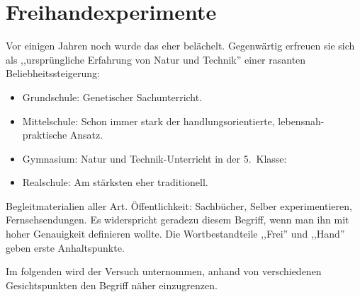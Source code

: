 \bip\bip
\section{Freihandexperimente}

Vor einigen Jahren noch wurde das eher bel\"{a}chelt. Gegenw\"{a}rtig erfreuen sie
sich als ,,urspr\"{u}ngliche Erfahrung von Natur und Technik'' einer rasanten
Beliebheitssteigerung:
\begin{itemize}
	\item Grundschule: Genetischer Sachunterricht.
	\item Mittelschule: Schon immer stark der handlungsorientierte, lebensnah-praktische
	Ansatz.
	\item Gymnasium: Natur und Technik-Unterricht in der 5.\ Klasse:
	\item Realschule: Am st\"{a}rksten eher traditionell.
\end{itemize}
\mip
Begleitmaterialien aller Art.
\mip
\"{O}ffentlichkeit: Sachb\"{u}cher, Selber experimentieren, Fernsehsendungen.
\mip
Es widerspricht geradezu diesem Begriff, wenn man ihn
mit hoher Genauigkeit definieren wollte.
\mip
Die Wortbestandteile ,,Frei'' und ,,Hand'' geben erste Anhaltspunkte.


Im folgenden wird der Versuch unternommen, anhand von
verschiedenen Gesichtspunkten den Begriff n\"{a}her einzugrenzen.

